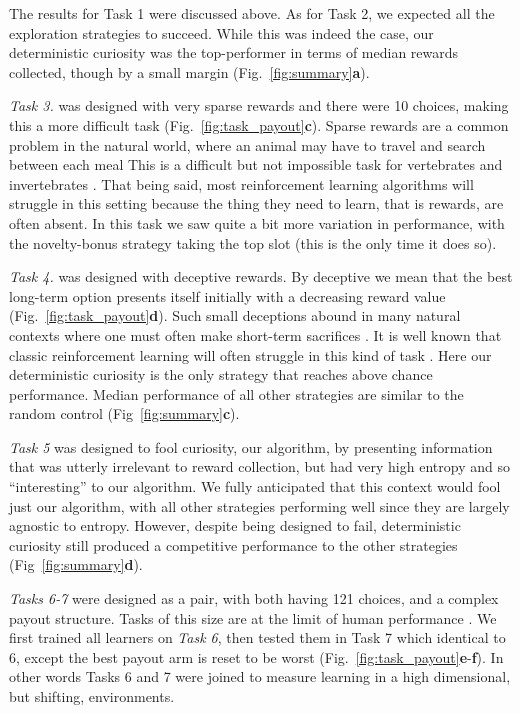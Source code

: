 The results for Task 1 were discussed above. As for Task 2, we expected all the exploration strategies to succeed. While this was indeed the case, our deterministic curiosity was the top-performer in terms of median rewards collected, though by a small margin (Fig.~\ref{fig:summary}\textbf{a}).

\textit{Task 3.} was designed with very sparse rewards \cite{Silver2016b,Silver2018} and there were 10 choices, making this a more difficult task (Fig.~\ref{fig:task_payout}\textbf{c}). Sparse rewards are a common problem in the natural world, where an animal may have to travel and search between each meal This is a difficult but not impossible task for vertebrates \cite{anderson1984optimal} and invertebrates \cite{westphal2006foraging}. That being said, most reinforcement learning algorithms will struggle in this setting because the thing they need to learn, that is rewards, are often absent. In this task we saw quite a bit more variation in performance, with the novelty-bonus strategy taking the top slot (this is the only time it does so).

\textit{Task 4.} was designed with deceptive rewards. By deceptive we mean that the best long-term option presents itself initially with a decreasing reward value (Fig.~\ref{fig:task_payout}\textbf{d}). Such small deceptions abound in many natural contexts where one must often make short-term sacrifices \cite{internicola2012bumble}. It is well known that classic reinforcement learning will often struggle in this kind of task \cite{Lehman2011a,Sutton2018}. Here our deterministic curiosity is the only strategy that reaches above chance performance. Median performance of all other strategies are similar to the random control (Fig~\ref{fig:summary}\textbf{c}). 

\textit{Task 5} was designed to fool curiosity, our algorithm, by presenting information that was utterly irrelevant to reward collection, but had very high entropy and so ``interesting'' to our algorithm. We fully anticipated that this context would fool just our algorithm, with all other strategies performing well since they are largely agnostic to entropy. However, despite being designed to fail, deterministic curiosity still produced a competitive performance to the other strategies (Fig~\ref{fig:summary}\textbf{d}). 

\textit{Tasks 6-7} were designed as a pair, with both having 121 choices, and a complex payout structure. Tasks of this size are at the limit of human performance \cite{Wu2018}. We first trained all learners on \textit{Task 6}, then tested them in Task 7 which identical to 6, except the best payout arm is reset to be worst (Fig.~\ref{fig:task_payout}\textbf{e}-\textbf{f}). In other words Tasks 6 and 7 were joined to measure learning in a high dimensional, but shifting, environments.

